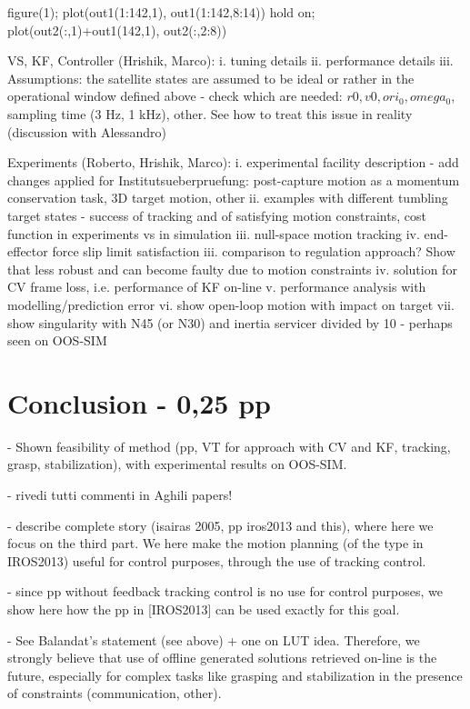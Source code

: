 	figure(1); plot(out1(1:142,1), out1(1:142,8:14))
	hold on; plot(out2(:,1)+out1(142,1), out2(:,2:8))


VS, KF, Controller (Hrishik, Marco):
	i. tuning details
	ii. performance details
	iii. Assumptions: the satellite states are assumed to be ideal or rather in the operational window defined above - check which are needed: $r0, v0, ori_0, omega_0$, sampling time (3 Hz, 1 kHz), other. See how to treat this issue in reality (discussion with Alessandro)


Experiments (Roberto, Hrishik, Marco):
	i. experimental facility description - add changes applied for Institutsueberpruefung: post-capture motion as a momentum conservation task, 3D target motion, other
	ii. examples with different tumbling target states - success of tracking and of satisfying motion constraints, cost function in experiments vs in simulation
	iii. null-space motion tracking
	iv. end-effector force slip limit satisfaction
	iii. comparison to regulation approach? Show that less robust and can become faulty due to motion constraints
	iv. solution for CV frame loss, i.e. performance of KF on-line
	v. performance analysis with modelling/prediction error
	vi. show open-loop motion with impact on target
	vii. show singularity with N45 (or N30) and inertia servicer divided by 10 - perhaps seen on OOS-SIM

%
\section{Conclusion - 0,25 pp}

- Shown feasibility of method (pp, VT for approach with CV and KF, tracking, grasp, stabilization), with experimental results on OOS-SIM.

- rivedi tutti commenti in Aghili papers!

- describe complete story (isairas 2005, pp iros2013 and this), where here we focus on the third part. We here make the motion planning (of the type in IROS2013) useful for control purposes, through the use of tracking control.

- since pp without feedback tracking control is no use for control purposes, we show here how the pp in [IROS2013] can be used exactly for this goal.

- See Balandat's statement (see above) + one on LUT idea. Therefore, we strongly believe that use of offline generated solutions retrieved on-line is the future, especially for complex tasks like grasping and stabilization in the presence of constraints (communication, other).


